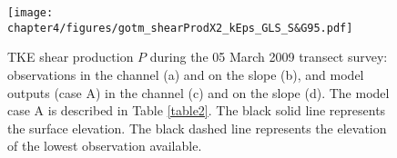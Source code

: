 %
%
%
%

\begin{figure}[t]
  \noindent
  \texttt{[image: chapter4/figures/gotm\_shearProdX2\_kEps\_GLS\_S\&G95.pdf]}\\
  \caption{TKE shear production $P$ during the 05 March 2009 transect survey: observations in the channel (a) and on the slope (b), and model outputs (case A) in the channel (c) and on the slope (d). The model case A is described in Table \ref{table2}. The black solid line represents the surface elevation. The black dashed line represents the elevation of the lowest observation available.}
  \label{gotmCaseAX2}
\end{figure}

